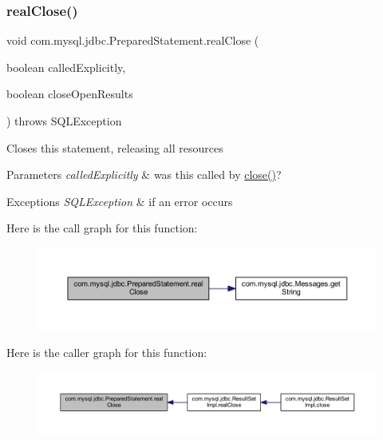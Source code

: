 \subsubsection{\texorpdfstring{real\+Close()}{realClose()}}
{\footnotesize\ttfamily void com.\+mysql.\+jdbc.\+Prepared\+Statement.\+real\+Close (\begin{DoxyParamCaption}\item[{boolean}]{called\+Explicitly,  }\item[{boolean}]{close\+Open\+Results }\end{DoxyParamCaption}) throws S\+Q\+L\+Exception\hspace{0.3cm}{\ttfamily [protected]}}

Closes this statement, releasing all resources


\begin{DoxyParams}{Parameters}
{\em called\+Explicitly} & was this called by \mbox{\hyperlink{classcom_1_1mysql_1_1jdbc_1_1_statement_impl_a740a220f82b06eace44154a089fbdf18}{close()}}?\\
\hline
\end{DoxyParams}

\begin{DoxyExceptions}{Exceptions}
{\em S\+Q\+L\+Exception} & if an error occurs \\
\hline
\end{DoxyExceptions}
Here is the call graph for this function\+:
\nopagebreak
\begin{figure}[H]
\begin{center}
\leavevmode
\includegraphics[width=350pt]{classcom_1_1mysql_1_1jdbc_1_1_prepared_statement_a20c0c136d44994a292aecb75b10b4133_cgraph}
\end{center}
\end{figure}
Here is the caller graph for this function\+:
\nopagebreak
\begin{figure}[H]
\begin{center}
\leavevmode
\includegraphics[width=350pt]{classcom_1_1mysql_1_1jdbc_1_1_prepared_statement_a20c0c136d44994a292aecb75b10b4133_icgraph}
\end{center}
\end{figure}
\mbox{\label{classcom_1_1mysql_1_1jdbc_1_1_prepared_statement_a435eccbc94fa43a060e987fa8236fbe8}} 
